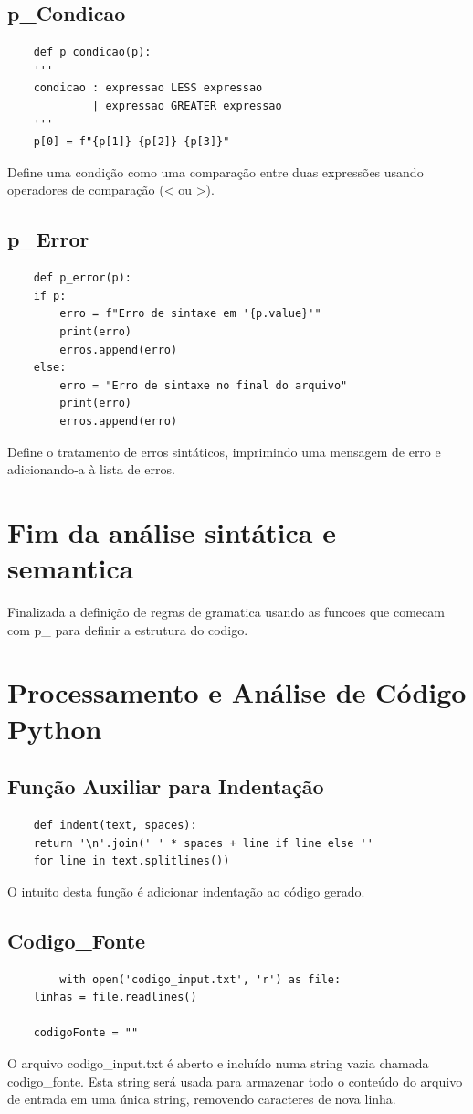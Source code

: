 \documentclass[a4paper,12pt]{article}
\begin{document}
\subsection{p\_Condicao}
\begin{verbatim}
    def p_condicao(p):
    '''
    condicao : expressao LESS expressao
             | expressao GREATER expressao
    '''
    p[0] = f"{p[1]} {p[2]} {p[3]}"
\end{verbatim}
Define uma condição como uma comparação entre duas expressões usando 
operadores de comparação (< ou >).
\subsection{p\_Error}
\begin{verbatim}
    def p_error(p):
    if p:
        erro = f"Erro de sintaxe em '{p.value}'"
        print(erro)
        erros.append(erro)
    else:
        erro = "Erro de sintaxe no final do arquivo"
        print(erro)
        erros.append(erro)
\end{verbatim}
Define o tratamento de erros sintáticos, imprimindo uma mensagem de erro 
e adicionando-a à lista de erros.

\section{Fim da análise sintática e semantica}
Finalizada a definição de regras de gramatica usando as funcoes que 
comecam com p\_ para definir a estrutura do codigo.

\section{Processamento e Análise de Código Python}

\subsection{Função Auxiliar para Indentação}
\begin{verbatim}
    def indent(text, spaces):
    return '\n'.join(' ' * spaces + line if line else '' 
    for line in text.splitlines())
\end{verbatim}
O intuito desta função é adicionar indentação ao código gerado.


\subsection{Codigo\_Fonte}
    \begin{verbatim}
        with open('codigo_input.txt', 'r') as file:
    linhas = file.readlines()

    codigoFonte = ""

\end{verbatim}   
O arquivo codigo\_input.txt é aberto e incluído numa string vazia 
chamada codigo\_fonte. Esta string será usada para armazenar todo o 
conteúdo do arquivo de entrada em uma única string, removendo caracteres 
de nova linha.
\end{document}
